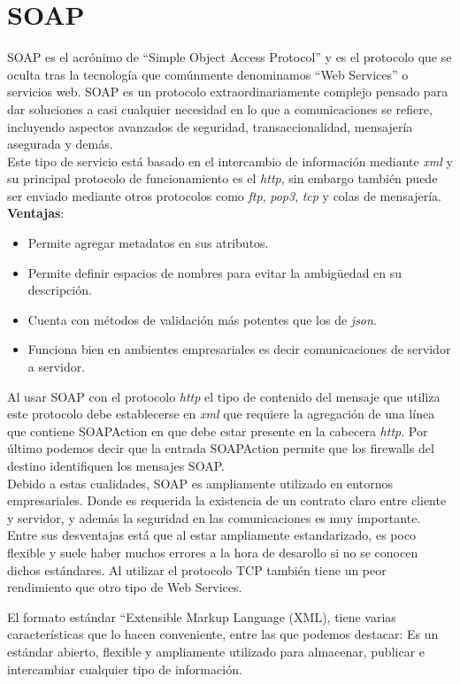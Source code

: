 \documentclass[
	12pt, %
	fleqn, %
	a4paper, %
	oneside, %
]{LegrandOrangeBook}
\begin{document}
\section{SOAP}
SOAP es el acrónimo de “Simple Object Access Protocol” y es el protocolo que se oculta tras la tecnología que comúnmente denominamos “Web Services” o servicios web. SOAP es un protocolo extraordinariamente complejo pensado para dar soluciones a casi cualquier necesidad en lo que a comunicaciones se refiere, incluyendo aspectos avanzados de seguridad, transaccionalidad, mensajería asegurada y demás.\\
Este tipo de servicio está basado en el intercambio de información mediante \textit{xml} y su principal protocolo de funcionamiento es el \textit{http}, sin embargo también puede ser enviado mediante otros protocolos como \textit{ftp}, \textit{pop3}, \textit{tcp} y colas de mensajería. \\
\textbf{Ventajas}:
\begin{itemize}
\item Permite agregar metadatos en sus atributos.
\item Permite definir espacios de nombres para evitar la ambigüedad en su descripción.
\item Cuenta con métodos de validación más potentes que los de \textit{json}.
\item Funciona bien en ambientes empresariales es decir comunicaciones de servidor a servidor.
\end{itemize}
Al usar SOAP con el protocolo \textit{http} el tipo de contenido del mensaje que utiliza este protocolo debe establecerse en \textit{xml} que requiere la agregación de una línea que contiene SOAPAction en que debe estar presente en la cabecera \textit{http}. Por último podemos decir que la entrada SOAPAction permite que los firewalls del destino identifiquen los mensajes SOAP.\\
Debido a estas cualidades, SOAP es ampliamente utilizado en entornos empresariales. Donde es requerida la existencia de un contrato claro entre cliente y servidor, y además la seguridad en las comunicaciones es muy importante. Entre sus desventajas está que al estar ampliamente estandarizado, es poco flexible y suele haber muchos errores a la hora de desarollo si no se conocen dichos estándares.  Al utilizar el protocolo TCP también tiene un peor rendimiento que otro tipo de Web Services.
\begin{vocabulary}[XML]
El formato estándar “Extensible Markup Language (XML), tiene varias características que lo hacen conveniente, entre las que podemos destacar: Es un estándar abierto, flexible y ampliamente utilizado para almacenar, publicar e intercambiar cualquier tipo de información.
\end{vocabulary}
\end{document}
